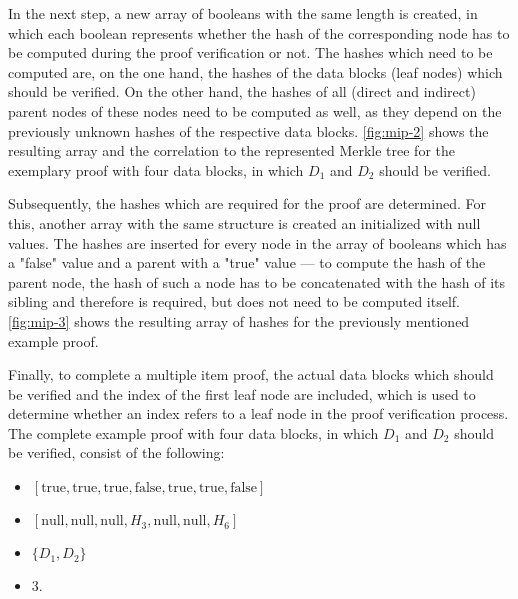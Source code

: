 			In the next step, a new array of booleans with the same length is created, in which each boolean represents whether the hash of the corresponding node has to be computed during the proof verification or not.
			The hashes which need to be computed are, on the one hand, the hashes of the data blocks (leaf nodes) which should be verified.
			On the other hand, the hashes of all (direct and indirect) parent nodes of these nodes need to be computed as well, as they depend on the previously unknown hashes of the respective data blocks.
			\autoref{fig:mip-2} shows the resulting array and the correlation to the represented Merkle tree for the exemplary proof with four data blocks, in which $D_1$ and $D_2$ should be verified.

			Subsequently, the hashes which are required for the proof are determined.
			For this, another array with the same structure is created an initialized with null values.
			The hashes are inserted for every node in the array of booleans which has a "false" value and a parent with a "true" value --- to compute the hash of the parent node, the hash of such a node has to be concatenated with the hash of its sibling and therefore is required, but does not need to be computed itself.
			\autoref{fig:mip-3} shows the resulting array of hashes for the previously mentioned example proof.

			Finally, to complete a multiple item proof, the actual data blocks which should be verified and the index of the first leaf node are included, which is used to determine whether an index refers to a leaf node in the proof verification process.
			The complete example proof with four data blocks, in which $D_1$ and $D_2$ should be verified, consist of the following:
			\begin{itemize}
				\item{} $[\textrm{true}, \textrm{true}, \textrm{true}, \textrm{false}, \textrm{true}, \textrm{true}, \textrm{false}]$
				\item{} $[\textrm{null}, \textrm{null}, \textrm{null}, H_3, \textrm{null}, \textrm{null}, H_6]$
				\item{} $\{D_1, D_2\}$
				\item{} $3$.
			\end{itemize}

